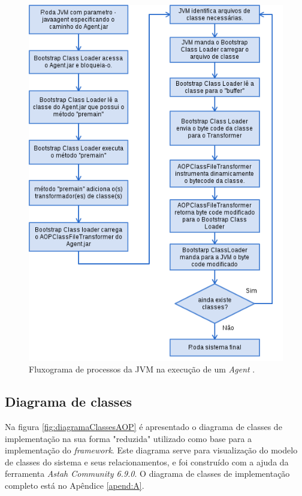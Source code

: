 \documentclass[tc,oneside]{iiufrgs}
\begin{document}
\begin{figure}[ht]
	\centering
	\includegraphics[scale=0.6]{diagramas/fluxograma_Agent.png}
	\caption{Fluxograma de processos da JVM na execução de um \textit{Agent} \cite{stark2001java}.}
	\label{fig:fluxogramaAgent}
\end{figure}

\subsection{Diagrama de classes}

Na figura \ref{fig:diagramaClassesAOP} é apresentado o diagrama de classes de implementação na sua forma "reduzida" utilizado como base para a implementação do \textit{framework}. Este diagrama serve para visualização do modelo de classes do sistema e seus relacionamentos, e foi construído com a ajuda da ferramenta \textit{Astah Community 6.9.0}. O diagrama de classes de implementação completo está no Apêndice \ref{apend:A}.
\end{document}
